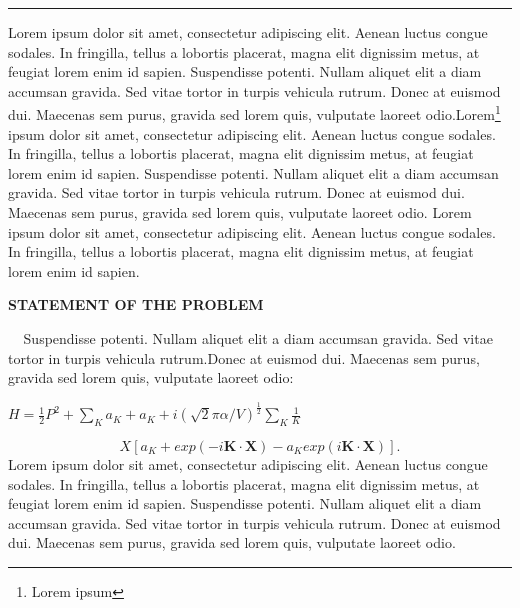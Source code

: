 \documentclass[a4paper, 9pt]{article}
\begin{document}
\begin{center} \noindent\rule[0.5cm]{5cm}{1pt} \end{center}
\begin{multicols}{2}
	{\LARGE L}orem ipsum dolor sit amet, consectetur adipiscing elit. Aenean luctus congue sodales. In fringilla, tellus a lobortis placerat, magna elit dignissim metus, at feugiat lorem enim id sapien. Suspendisse potenti. Nullam aliquet elit a diam accumsan gravida. Sed vitae tortor in turpis vehicula rutrum. Donec at euismod dui. Maecenas sem purus, gravida sed lorem quis, vulputate laoreet odio.Lorem\footnote{Lorem ipsum} ipsum dolor sit amet, consectetur adipiscing elit. Aenean luctus congue sodales. In fringilla, tellus a lobortis placerat, magna elit dignissim metus, at feugiat lorem enim id sapien. Suspendisse potenti. Nullam aliquet elit a diam accumsan gravida. Sed vitae tortor in turpis vehicula rutrum. Donec at euismod dui. Maecenas sem purus, gravida sed lorem quis, vulputate laoreet odio.
	Lorem ipsum dolor sit amet, consectetur adipiscing elit. Aenean luctus congue sodales. In fringilla, tellus a lobortis placerat, magna elit dignissim metus, at feugiat lorem enim id sapien.  \\
	\begin{center} \footnotesize\textbf{STATEMENT OF THE PROBLEM} \end{center}$\;\;\;\;$Suspendisse potenti. Nullam aliquet elit a diam accumsan gravida. Sed vitae tortor in turpis vehicula rutrum.Donec at euismod dui. Maecenas sem purus, gravida sed lorem quis, vulputate laoreet odio:\\ \begin{center} $ H=\frac{1}{2}P^2+\sum _K a_K+a_K+i(\sqrt{2}\pi\alpha/V)^{\frac{1}{2}}\sum _K\frac{1}{K}$ \end{center}\begin{equation}X[a_K+exp(-i\textbf{K}\cdot \textbf{X})-a_Kexp(i\textbf{K} \cdot \textbf{X})]. \end{equation}Lorem ipsum dolor sit amet, consectetur adipiscing elit. Aenean luctus congue sodales. In fringilla, tellus a lobortis placerat, magna elit dignissim metus, at feugiat lorem enim id sapien. Suspendisse potenti. Nullam aliquet elit a diam accumsan gravida. Sed vitae tortor in turpis vehicula rutrum. Donec at euismod dui. Maecenas sem purus, gravida sed lorem quis, vulputate laoreet odio.

\end{multicols}
\end{document}
